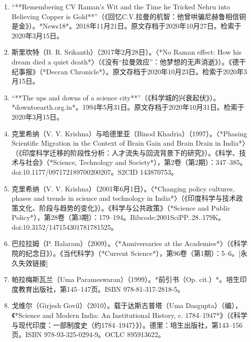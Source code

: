 \begin{enumerate}
\item “**Remembering CV Raman's Wit and the Time he Tricked Nehru into Believing Copper is Gold**”（《回忆C.V.拉曼的机智：他曾哄骗尼赫鲁相信铜是金》）。*News18*。2018年11月21日。原文存档于2020年10月27日。检索于2020年3月15日。

\item 斯里坎特（B. R. Srikanth）（2017年2月28日）。〈*No Raman effect: How his dream died a quiet death*〉（《没有“拉曼效应”：他梦想的无声消逝》）。《德干纪事报》（*Deccan Chronicle*）。原文存档于2020年10月23日。检索于2020年3月15日。

\item “**The ups and downs of a science city**”（《科学城的兴衰起伏》）。*downtoearth.org.in*。1994年5月31日。原文存档于2020年10月31日。检索于2020年3月15日。

\item 克里希纳（V. V. Krishna）与哈德里亚（Binod Khadria）（1997）。〈*Phasing Scientific Migration in the Context of Brain Gain and Brain Drain in India*〉（《印度科学迁移的阶段性分析：人才流失与回流背景下的研究》）。《科学、技术与社会》（*Science, Technology and Society*），第2卷（第2期）：347–385。doi:10.1177/097172189700200207。S2CID 143870753。

\item 克里希纳（V. V. Krishna）（2001年6月1日）。〈*Changing policy cultures, phases and trends in science and technology in India*〉（《印度科学与技术政策文化、阶段与趋势的变化》）。《科学与公共政策》（*Science and Public Policy*），第28卷（第3期）：179–194。Bibcode:2001SciPP..28..179K。doi:10.3152/147154301781781525。

\item 巴拉拉姆（P. Balaram）（2009）。〈*Anniversaries at the Academies*〉（《科学院的纪念日》）。《当代科学》（*Current Science*），第96卷（第1期）：5–6。[永久失效链接]

\item 帕拉梅斯瓦兰（Uma Parameswaran）（1999）。*前引书（Op. cit.）*。培生印度教育出版社，第145–147页。ISBN 978-81-317-2818-5。

\item 戈维尔（Girjesh Govil）（2010）。载于达斯古普塔（Uma Dasgupta）（编），《*Science and Modern India: An Institutional History, c. 1784–1947*》（《科学与现代印度：一部制度史（约1784–1947）》）。德里：培生出版社，第143–156页。ISBN 978-93-325-0294-9。OCLC 895913622。

\end{enumerate}